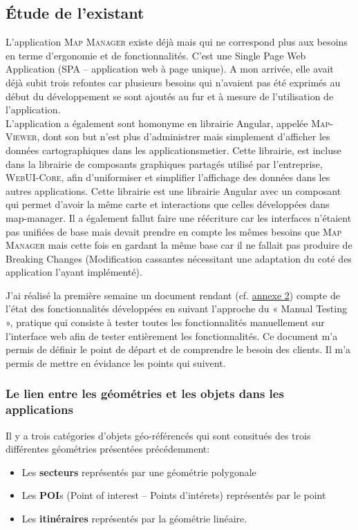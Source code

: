 \documentclass{rapportUHA40}
\begin{document}
\subsection{Étude de l'existant}
L'application \textsc{Map Manager} existe déjà mais qui ne correspond plus aux
besoins en terme d'ergonomie et de fonctionnalités. C'est une Single Page Web
Application (SPA – application web à page unique). A mon arrivée, elle avait
déjà subit trois refontes car plusieurs besoins qui n'avaient pas été exprimés
au début du développement se sont ajoutés au fur et à mesure de l'utilisation
de l'application. \\

L'application a également sont homonyme en librairie Angular, appelée
\textsc{Map-Viewer}, dont son but n'est plus d'administrer mais simplement
d'afficher les données cartographiques dans les \gls{applicationsmetier}. Cette
librairie, est incluse dans la librairie de composants graphiques partagés
utilisé par l'entreprise, \textsc{WebUI-Core}, afin d'uniformiser et simplifier
l'affichage des données dans les autres applications. Cette librairie est une
librairie Angular avec un composant qui permet d'avoir la même carte et
interactions que celles développées dans map-manager. Il a également fallut
faire une réécriture car les interfaces n'étaient pas unifiées de base mais
devait prendre en compte les mêmes besoins que \textsc{Map Manager} mais cette
fois en gardant la même base car il ne fallait pas produire de Breaking Changes
(Modification cassantes nécessitant une adaptation du coté des application
l'ayant implémenté).

J’ai réalisé la première semaine un document rendant (cf.
\hyperlink{ANNEX2}{annexe 2}) compte de l’état des fonctionnalités développées
en suivant l’approche du « Manual Testing », pratique qui consiste à tester
toutes les fonctionnalités manuellement sur l’interface web afin de tester
entièrement les fonctionnalités. Ce document m’a permis de définir le point de
départ et de comprendre le besoin des clients. Il m'a permis de mettre en
évidance les points qui suivent.

\subsubsection{Le lien entre les géométries et les objets dans les applications}
Il y a trois catégories d'objets géo-référencés qui sont consitués des trois
différentes géométries présentées précédemment:
\begin{itemize}
  \item Les \textbf{secteurs} représentés par une géométrie polygonale
  \item Les \textbf{POI}s (Point of interest – Points d'intérets) représentés par le
        point
  \item Les \textbf{itinéraires} représentés par la géométrie linéaire. \\
\end{itemize}
\end{document}
